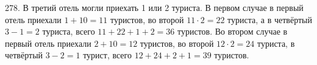 278. В третий отель могли приехать 1 или 2 туриста. В первом случае в первый отель приехали $1+10=11$ туристов, во второй $11\cdot2=22$ туриста, а в четвёртый $3-1=2$ туриста, всего $11+22+1+2=36$ туристов. Во втором случае в первый отель приехали $2+10=12$ туристов, во второй $12\cdot2=24$ туриста, в четвёртый $3-2=1$ турист, всего $12+24+2+1=39$ туристов.\\
